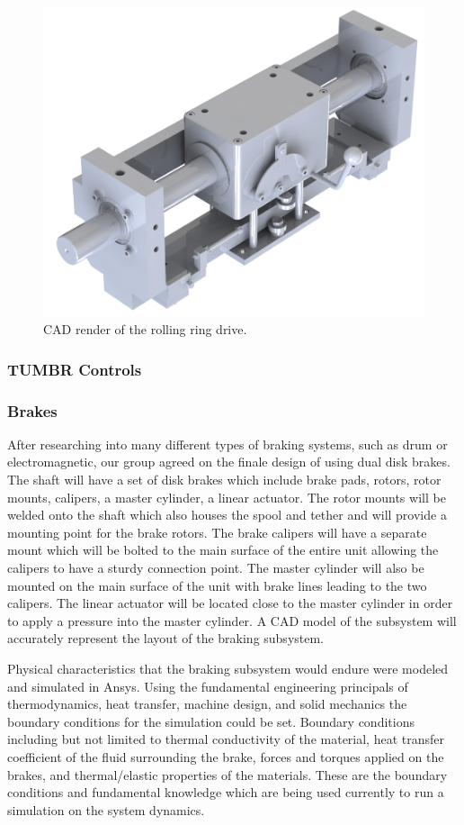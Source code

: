 \begin{figure}[H]
  \centering
  \includegraphics[width=.7\textwidth]{Figures/RollingRingDrive.png}
  \caption{\label{fig:RollingRingDrive}CAD render of the rolling ring drive.}
\end{figure}

\subsubsection{TUMBR Controls}

\subsubsection{Brakes}

\indent\indent After researching into many different types of braking systems, such as drum or electromagnetic, our group agreed on the finale design of using dual disk brakes. The shaft will have a set of disk brakes which include brake pads, rotors, rotor mounts, calipers, a master cylinder, a linear actuator. The rotor mounts will be welded onto the shaft which also houses the spool and tether and will provide a mounting point for the brake rotors. The brake calipers will have a separate mount which will be bolted to the main surface of the entire unit allowing the calipers to have a sturdy connection point. The master cylinder will also be mounted on the main surface of the unit with brake lines leading to the two calipers. The linear actuator will be located close to the master cylinder in order to apply a pressure into the master cylinder. A CAD model of the subsystem will accurately represent the layout of the braking subsystem.

Physical characteristics that the braking subsystem would endure were modeled and simulated in Ansys.  Using the fundamental engineering principals of thermodynamics, heat transfer, machine design, and solid mechanics the boundary conditions for the simulation could be set. Boundary conditions including but not limited to thermal conductivity of the material, heat transfer coefficient of the fluid surrounding the brake, forces and torques applied on the brakes, and thermal/elastic properties of the materials. These are the boundary conditions and fundamental knowledge which are being used currently to run a simulation on the system dynamics. 

